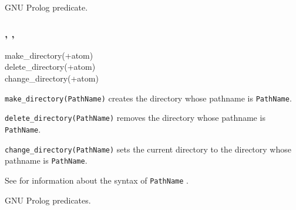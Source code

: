 GNU Prolog predicate.

\subsubsection{,
               ,
               }

\begin{TemplatesOneCol}
make\_directory(+atom)\\
delete\_directory(+atom)\\
change\_directory(+atom)

\end{TemplatesOneCol}

\Description

\texttt{make\_directory(PathName)} creates the directory whose pathname is
\texttt{PathName}.

\texttt{delete\_directory(PathName)} removes the directory whose pathname is
\texttt{PathName}.

\texttt{change\_directory(PathName)} sets the current directory to the
directory whose pathname is \texttt{PathName}.

See  for information about the syntax of
\texttt{PathName} .

\begin{PlErrors}





\end{PlErrors}

\Portability

GNU Prolog predicates.

\subsubsection{}

